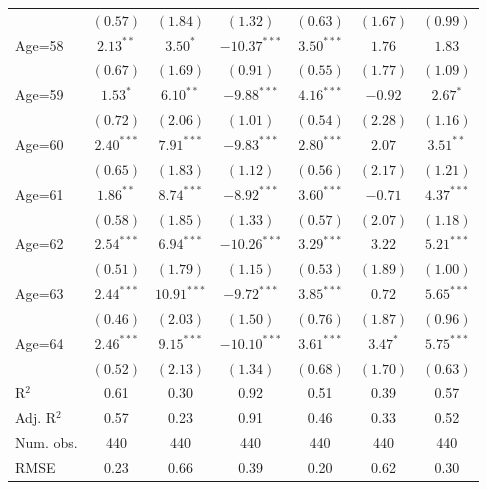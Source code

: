 \documentclass[fullpage]{paper}
\begin{document}
\begin{center}
\begin{longtable}{l c c c c c c }
            & $(0.57)$      & $(1.84)$      & $(1.32)$       & $(0.63)$     & $(1.67)$      & $(0.99)$      \\
Age=58      & $2.13^{**}$   & $3.50^{*}$    & $-10.37^{***}$ & $3.50^{***}$ & $1.76$        & $1.83$        \\
            & $(0.67)$      & $(1.69)$      & $(0.91)$       & $(0.55)$     & $(1.77)$      & $(1.09)$      \\
Age=59      & $1.53^{*}$    & $6.10^{**}$   & $-9.88^{***}$  & $4.16^{***}$ & $-0.92$       & $2.67^{*}$    \\
            & $(0.72)$      & $(2.06)$      & $(1.01)$       & $(0.54)$     & $(2.28)$      & $(1.16)$      \\
Age=60      & $2.40^{***}$  & $7.91^{***}$  & $-9.83^{***}$  & $2.80^{***}$ & $2.07$        & $3.51^{**}$   \\
            & $(0.65)$      & $(1.83)$      & $(1.12)$       & $(0.56)$     & $(2.17)$      & $(1.21)$      \\
Age=61      & $1.86^{**}$   & $8.74^{***}$  & $-8.92^{***}$  & $3.60^{***}$ & $-0.71$       & $4.37^{***}$  \\
            & $(0.58)$      & $(1.85)$      & $(1.33)$       & $(0.57)$     & $(2.07)$      & $(1.18)$      \\
Age=62      & $2.54^{***}$  & $6.94^{***}$  & $-10.26^{***}$ & $3.29^{***}$ & $3.22$        & $5.21^{***}$  \\
            & $(0.51)$      & $(1.79)$      & $(1.15)$       & $(0.53)$     & $(1.89)$      & $(1.00)$      \\
Age=63      & $2.44^{***}$  & $10.91^{***}$ & $-9.72^{***}$  & $3.85^{***}$ & $0.72$        & $5.65^{***}$  \\
            & $(0.46)$      & $(2.03)$      & $(1.50)$       & $(0.76)$     & $(1.87)$      & $(0.96)$      \\
Age=64      & $2.46^{***}$  & $9.15^{***}$  & $-10.10^{***}$ & $3.61^{***}$ & $3.47^{*}$    & $5.75^{***}$  \\
            & $(0.52)$      & $(2.13)$      & $(1.34)$       & $(0.68)$     & $(1.70)$      & $(0.63)$      \\
\hline
R$^2$       & 0.61          & 0.30          & 0.92           & 0.51         & 0.39          & 0.57          \\
Adj. R$^2$  & 0.57          & 0.23          & 0.91           & 0.46         & 0.33          & 0.52          \\
Num. obs.   & 440           & 440           & 440            & 440          & 440           & 440           \\
RMSE        & 0.23          & 0.66          & 0.39           & 0.20         & 0.62          & 0.30          \\
\end{longtable}
\end{center}
\end{document}
